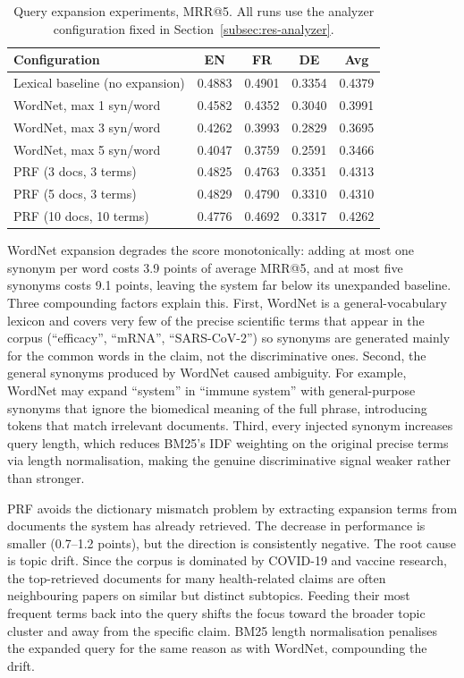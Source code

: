 \begin{table}[!ht]
    \caption{Query expansion experiments, MRR@5. All runs use the analyzer configuration fixed in Section~\ref{subsec:res-analyzer}.}
    \label{tab:expansion}
    \centering
    \begin{tabular}{lcccc}
        \toprule
        Configuration & EN & FR & DE & Avg \\
        \midrule
        Lexical baseline (no expansion)         & 0.4883 & 0.4901 & 0.3354 & 0.4379 \\
        \midrule
        WordNet, max 1 syn/word                  & 0.4582 & 0.4352 & 0.3040 & 0.3991 \\
        WordNet, max 3 syn/word                  & 0.4262 & 0.3993 & 0.2829 & 0.3695 \\
        WordNet, max 5 syn/word                  & 0.4047 & 0.3759 & 0.2591 & 0.3466 \\
        \midrule
        PRF (3 docs, 3 terms)                    & 0.4825 & 0.4763 & 0.3351 & 0.4313 \\
        PRF (5 docs, 3 terms)                    & 0.4829 & 0.4790 & 0.3310 & 0.4310 \\
        PRF (10 docs, 10 terms)                  & 0.4776 & 0.4692 & 0.3317 & 0.4262 \\
        \bottomrule
    \end{tabular}
\end{table}

WordNet expansion degrades the score monotonically: adding at most one synonym per word costs 3.9 points of average MRR@5, and at most five synonyms costs 9.1 points, leaving the system far below its unexpanded baseline. Three compounding factors explain this. First, WordNet is a general-vocabulary lexicon and covers very few of the precise scientific terms that appear in the corpus (``efficacy'', ``mRNA'', ``SARS-CoV-2'') so synonyms are generated mainly for the common words in the claim, not the discriminative ones. Second, the general synonyms produced by WordNet caused ambiguity. For example, WordNet may expand ``system'' in ``immune system'' with general-purpose synonyms that ignore the biomedical meaning of the full phrase, introducing tokens that match irrelevant documents. Third, every injected synonym increases query length, which reduces BM25's IDF weighting on the original precise terms via length normalisation, making the genuine discriminative signal weaker rather than stronger.

PRF avoids the dictionary mismatch problem by extracting expansion terms from documents the system has already retrieved. The decrease in performance is smaller (0.7--1.2 points), but the direction is consistently negative. The root cause is topic drift. Since the corpus is dominated by COVID-19 and vaccine research, the top-retrieved documents for many health-related claims are often neighbouring papers on similar but distinct subtopics. Feeding their most frequent terms back into the query shifts the focus toward the broader topic cluster and away from the specific claim. BM25 length normalisation penalises the expanded query for the same reason as with WordNet, compounding the drift.

